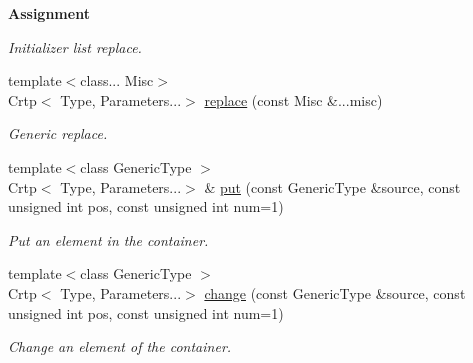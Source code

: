\begin{Indent}{\bf Assignment}
\begin{DoxyCompactItemize}
\begin{DoxyCompactList}\small\item\em Initializer list replace. \end{DoxyCompactList}\item 
{\footnotesize template$<$class... Misc$>$ }\\Crtp$<$ Type, Parameters...$>$ \hyperlink{classmagrathea_1_1StaticVectorizer_a81bc8121599b9da4425a5d73eb65dec4}{replace} (const Misc \&...misc)
\begin{DoxyCompactList}\small\item\em Generic replace. \end{DoxyCompactList}\item 
{\footnotesize template$<$class Generic\-Type $>$ }\\Crtp$<$ Type, Parameters...$>$ \& \hyperlink{classmagrathea_1_1StaticVectorizer_a68070ddd4235454ca5fae28888353a87}{put} (const Generic\-Type \&source, const unsigned int pos, const unsigned int num=1)
\begin{DoxyCompactList}\small\item\em Put an element in the container. \end{DoxyCompactList}\item 
{\footnotesize template$<$class Generic\-Type $>$ }\\Crtp$<$ Type, Parameters...$>$ \hyperlink{classmagrathea_1_1StaticVectorizer_acb350662a8c17a5476b331d23917b084}{change} (const Generic\-Type \&source, const unsigned int pos, const unsigned int num=1)
\begin{DoxyCompactList}\small\item\em Change an element of the container. \end{DoxyCompactList}\end{DoxyCompactItemize}
\end{Indent}
